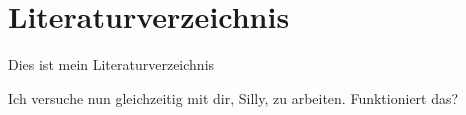 \chapter{Literaturverzeichnis}
Dies ist mein Literaturverzeichnis

Ich versuche nun gleichzeitig mit dir, Silly, zu arbeiten. Funktioniert das?